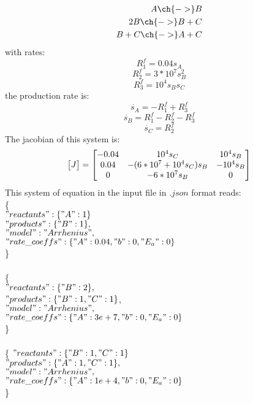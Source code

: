 \documentclass[11pt]{amsart}
\begin{document}
\begin{align}
    A \ch{->} B \\
    2B\ch{->} B + C\\
    B +C \ch{->} A + C
\end{align}
with rates:
$$
R_1^f=0.04 s_A
$$
$$
R_2^f=3*10^7 s_B^2
$$
$$
R_3^f=10^4 s_Bs_C
$$
the production rate is:
$$
\dot{s_A}=-R_1^f + R_3^f
$$
$$
\dot{s_B}=R_1^f - R_2^f-R_3^f
$$
$$
\dot{s_C}=R_2^f 
$$
The jacobian of this system is:
\begin{equation}
\begin{bmatrix} J
\end{bmatrix}=
\begin{bmatrix} -0.04&10^4s_C&10^4 s_B\\0.04&-(6*10^7+10^4s_C)s_B&-10^4s_B\\0&-6*10^7s_B&0
\end{bmatrix}
\notag
\end{equation}
This system of equation in the input file in $.json$ format reads:\\
\{\\
$"reactants" : \{ "A" : 1\}$\\
$"products" : \{ "B" : 1\},$\\
$"model": "Arrhenius",$\\
$"rate\_coeffs" : \{"A":0.04, "b":0,"E_a":0\}$\\
\}\\
\\
\{\\
$"reactants" : \{ "B" : 2 \},$\\
$"products" : \{ "B" : 1, "C" : 1 \}$,\\
$"model": "Arrhenius",$\\
$"rate\_coeffs" : \{"A":3e+7, "b":0,"E_a":0\}$\\
\}\\
\\
\{
$"reactants":\{ "B" : 1, "C" : 1 \}$\\
$"products" : \{ "A" : 1, "C" : 1 \},$\\
$"model": "Arrhenius",$\\
$"rate\_coeffs" : \{"A":1e+4, "b":0,"E_a":0\}$\\
\}\\
\end{document}
